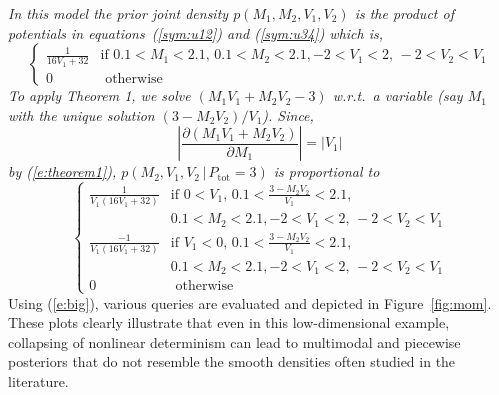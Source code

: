 \documentclass[letterpaper]{article}
\newcommand{\otherwise}[1]{#1 &\text{ otherwise}}
\newcommand{\pr}{p}
\begin{document}
\emph{
\noindent
In this model the prior joint density ${\pr(M_1, M_2, V_1, V_2)}$ is the product of potentials in equations~(\ref{sym:u12}) and (\ref{sym:u34}) which is,
$$
\begin{cases}
\frac{1}{16 V_1 + 32} &{\text{if }\scriptstyle 0.1<M_1<2.1, \, 0.1<M_2<2.1,}
							 {\scriptstyle -2<V_1<2, \, -2<V_2 < V_1}\\
 \otherwise{0}
 \end{cases}
$$  
To apply Theorem 1, we solve {\footnotesize$(M_1 V_1 + M_2 V_2 - 3)$}
w.r.t.\ a variable (say $M_1$ with the unique solution {\footnotesize$(3 - M_2 V_2)/V_1$}).
Since,  
{\footnotesize
$$\left| \frac{\partial (M_1 V_1 + M_2 V_2)}{\partial M_1} \right| = |V_1|
$$
}
by (\ref{e:theorem1}),
$\pr(M_2, V_1, V_2 \,|\, P_\text{tot} = 3)$ is proportional to
{\footnotesize
\begin{equation}\label{e:big}  
\begin{cases}
\frac{1}{V_1(16 V_1 + 32)} &{\text{if }\scriptstyle 0<V_1, \, 0.1<\frac{3-M_2 V_2}{V_1}<2.1,}\\
							 &{\scriptstyle 0.1<M_2<2.1, -2<V_1<2, \, -2<V_2 < V_1}\\
\frac{-1}{V_1(16 V_1 + 32)} &{\text{if }\scriptstyle V_1<0, \, 0.1<\frac{3-M_2 V_2}{V_1}<2.1,}\\
							 &{\scriptstyle 0.1<M_2<2.1, -2<V_1<2, \, -2<V_2 < V_1}\\
 \otherwise{0}
 \end{cases}
\end{equation}
}
}%
Using (\ref{e:big}), various queries are evaluated and depicted in Figure~\ref{fig:mom}.
These plots clearly illustrate that even in this 
low-dimensional example, collapsing of nonlinear determinism can lead
to multimodal and piecewise posteriors that do not resemble the
smooth densities often studied in the literature.  
\end{document}
